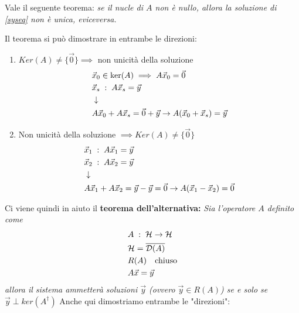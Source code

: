 Vale il seguente teorema: \textit{se il nucle di $A$ non è nullo, allora la soluzione di \ref{syseq} non è unica, eviceversa.}

Il teorema si può dimostrare in entrambe le direzioni:
\begin{enumerate}
	\item $Ker(A) \neq \{\vec{0}\} \implies$ non unicità della soluzione
	\begin{align}
		&\vec{x}_0 \in \ker(A) \implies A \vec{x}_0 =  \vec{0}\\
		&\vec{x}_s \; : \; A \vec{x}_s = \vec{y} \\ &\downarrow \nonumber \\
		& A \vec{x}_0 + A \vec{x}_s =  \vec{0} + \vec{y} \to A(\vec{x}_0 + \vec{x}_s) = \vec{y} 
	\end{align}
	\item Non unicità della soluzione $\implies Ker(A) \neq \{\vec{0}\}$
	\begin{align}
		&\vec{x}_1 \; : \; A \vec{x}_1 = \vec{y} \\
		&\vec{x}_2 \; : \; A \vec{x}_2 = \vec{y} \\ &\downarrow \nonumber \\
		& A \vec{x}_1 + A \vec{x}_2 =  \vec{y} - \vec{y} = \vec{0} \to A(\vec{x}_1 - \vec{x}_2) = \vec{0} 
	\end{align}
\end{enumerate}
Ci viene quindi in aiuto il \textbf{teorema dell'alternativa:} \textit{Sia l'operatore $A$ definito come
	\begin{align}
		&A \; : \; \mathcal{H} \to \mathcal{H}\\
		&\mathcal{H} = \overline{\mathcal{D}(A)}\\
		&R(A) \quad \text{chiuso}\\
		&A \vec{x} = \vec{y} 
	\end{align}	
	allora il sistema ammetterà soluzioni $\vec{y}$ (ovvero $\vec{y} \in R(A)$) se e solo se $\vec{y} \perp ker(A^\dagger)$
}
Anche qui dimostriamo entrambe le "direzioni":
